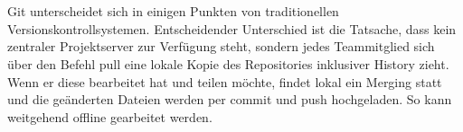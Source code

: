 \\
\\
Git unterscheidet sich in einigen Punkten von traditionellen Versionskontrollsystemen. Entscheidender Unterschied ist die Tatsache, dass kein zentraler Projektserver zur Verfügung steht, sondern jedes Teammitglied sich über den Befehl pull eine lokale Kopie des Repositories inklusiver History zieht. Wenn er diese bearbeitet hat und teilen möchte, findet lokal ein Merging  statt und die geänderten Dateien werden per commit und push hochgeladen. So kann weitgehend offline gearbeitet werden. 


\autorende{}